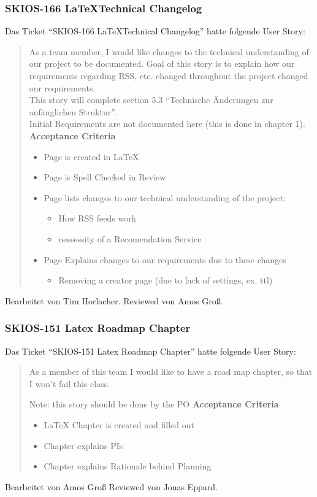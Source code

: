 \subsubsection{SKIOS-166 \LaTeX Technical Changelog}
Das Ticket \enquote{SKIOS-166 \LaTeX Technical Changelog} hatte folgende User Story:
\begin{quotation}
    As a team member, I would like changes to the technical understanding of our project to be documented.
    Goal of this story is to explain how our requirements regarding RSS, etc. changed throughout the project changed our requirements. \\
    This story will complete section 5.3 “Technische Änderungen zur anfänglichen Struktur”. \\
    Initial Requirements are not documented here (this is done in chapter 1).
\textbf{Acceptance Criteria}
\begin{itemize}
    \item Page is created in LaTeX
    \item Page is Spell Checked in Review
    \item Page lists changes to our technical understanding of the project:
    \begin{itemize}
        \item How RSS feeds work
        \item nessessity of a Recomendation Service
    \end{itemize}
    \item Page Explains changes to our requirements due to these changes
    \begin{itemize}
        \item Removing a creator page (due to lack of settings, ex. ttl)
    \end{itemize}
\end{itemize}
\end{quotation}
Bearbeitet von Tim Horlacher.
Reviewed von Amos Groß.

\subsubsection{SKIOS-151 Latex Roadmap Chapter}
Das Ticket \enquote{SKIOS-151 Latex Roadmap Chapter} hatte folgende User Story:
\begin{quotation}
    As a member of this team I would like to have a road map chapter, so that I won’t fail this class.

    Note: this story should be done by the PO
\textbf{Acceptance Criteria}
\begin{itemize}
    \item LaTeX Chapter is created and filled out
    \item Chapter explains PIs
    \item Chapter explains Rationale behind Planning
\end{itemize}
\end{quotation}
Bearbeitet von Amos Groß
Reviewed von Jonas Eppard.
